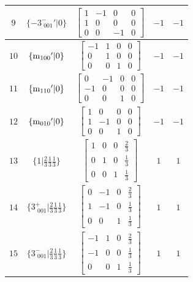 \documentclass[fleqn,8pt]{jsarticle}
\begin{document}
\begin{longtable}{ccccc}
$ 9 $ & $ \{-3^{-}_{\,\,001}{}'|0\} $ & $ \begin{bmatrix} 1 & -1 & 0 & 0 \\ 1 & 0 & 0 & 0 \\ 0 & 0 & -1 & 0 \end{bmatrix} $ & $ -1 $ & $ -1 $ \\ \hline
$ 10 $ & $ \{{\rm m}_{100}{}'|0\} $ & $ \begin{bmatrix} -1 & 1 & 0 & 0 \\ 0 & 1 & 0 & 0 \\ 0 & 0 & 1 & 0 \end{bmatrix} $ & $ -1 $ & $ -1 $ \\ \hline
$ 11 $ & $ \{{\rm m}_{110}{}'|0\} $ & $ \begin{bmatrix} 0 & -1 & 0 & 0 \\ -1 & 0 & 0 & 0 \\ 0 & 0 & 1 & 0 \end{bmatrix} $ & $ -1 $ & $ -1 $ \\ \hline
$ 12 $ & $ \{{\rm m}_{010}{}'|0\} $ & $ \begin{bmatrix} 1 & 0 & 0 & 0 \\ 1 & -1 & 0 & 0 \\ 0 & 0 & 1 & 0 \end{bmatrix} $ & $ -1 $ & $ -1 $ \\ \hline
$ 13 $ & $ \{1|\frac{2}{3} \frac{1}{3} \frac{1}{3}\} $ & $ \begin{bmatrix} 1 & 0 & 0 & \frac{2}{3} \\ 0 & 1 & 0 & \frac{1}{3} \\ 0 & 0 & 1 & \frac{1}{3} \end{bmatrix} $ & $ 1 $ & $ 1 $ \\ \hline
$ 14 $ & $ \{3^{+}_{\,\,001}|\frac{2}{3} \frac{1}{3} \frac{1}{3}\} $ & $ \begin{bmatrix} 0 & -1 & 0 & \frac{2}{3} \\ 1 & -1 & 0 & \frac{1}{3} \\ 0 & 0 & 1 & \frac{1}{3} \end{bmatrix} $ & $ 1 $ & $ 1 $ \\ \hline
$ 15 $ & $ \{3^{-}_{\,\,001}|\frac{2}{3} \frac{1}{3} \frac{1}{3}\} $ & $ \begin{bmatrix} -1 & 1 & 0 & \frac{2}{3} \\ -1 & 0 & 0 & \frac{1}{3} \\ 0 & 0 & 1 & \frac{1}{3} \end{bmatrix} $ & $ 1 $ & $ 1 $ \\ \hline

\end{longtable}
\end{document}
